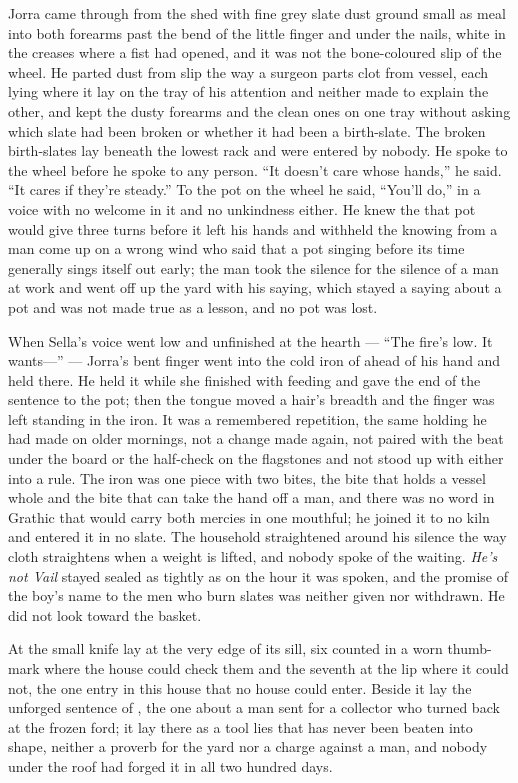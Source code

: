 Jorra came through from the shed with fine grey slate dust ground small as meal into both forearms past the bend of the little finger and under the nails, white in the creases where a fist had opened, and it was not the bone-coloured slip of the wheel. He parted dust from slip the way a surgeon parts clot from vessel, each lying where it lay on the tray of his attention and neither made to explain the other, and kept the dusty forearms and the clean ones on one tray without asking which slate had been broken or whether it had been a birth-slate. The broken birth-slates lay beneath the lowest rack and were entered by nobody. He spoke to the wheel before he spoke to any person. “It doesn't care whose hands,” he said. “It cares if they're steady.” To the pot on the wheel he said, “You'll do,” in a voice with no welcome in it and no unkindness either. He knew the  that pot would give three turns before it left his hands and withheld the knowing from a man come up on a wrong wind who said that a pot singing before its time generally sings itself out early; the man took the silence for the silence of a man at work and went off up the yard with his saying, which stayed a saying about a pot and was not made true as a lesson, and no pot was lost.

When Sella's voice went low and unfinished at the hearth --- “The fire's low. It wants---” --- Jorra's bent finger went into the cold iron of  ahead of his hand and held there. He held it while she finished with feeding and gave the end of the sentence to the pot; then the tongue moved a hair's breadth and the finger was left standing in the iron. It was a remembered repetition, the same holding he had made on older mornings, not a change made again, not paired with the beat under the board or the half-check on the flagstones and not stood up with either into a rule. The iron was one piece with two bites, the bite that holds a vessel whole and the bite that can take the hand off a man, and there was no word in Grathic that would carry both mercies in one mouthful; he joined it to no kiln and entered it in no slate. The household straightened around his silence the way cloth straightens when a weight is lifted, and nobody spoke of the waiting. \emph{He's not Vail} stayed sealed as tightly as on the hour it was spoken, and the promise of the boy's name to the men who burn slates was neither given nor withdrawn. He did not look toward the basket.

\scenebreak

At  the small knife lay at the very edge of its sill, six counted in a worn thumb-mark where the house could check them and the seventh at the lip where it could not, the one entry in this house that no house could enter. Beside it lay the unforged sentence of , the one about a man sent for a collector who turned back at the frozen ford; it lay there as a tool lies that has never been beaten into shape, neither a proverb for the yard nor a charge against a man, and nobody under the roof had forged it in all two hundred days.

